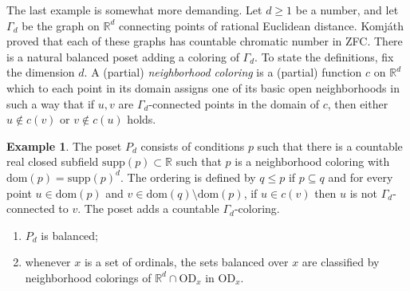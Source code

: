 \documentclass{article}
\newcommand{\supp}{\mathrm{supp}}
\newcommand{\dom}{\mathrm{dom}}
\newcommand{\vd}{\mathrm{OD}}
\theoremstyle{definition}
\newtheorem{example}[theorem]{Example}
\begin{document}
\noindent The last example is somewhat more demanding. Let $d\geq 1$ be a number, and let $\Gamma_d$ be the graph on $\mathbb{R}^d$ connecting points of rational Euclidean distance. Komj{\' a}th \cite{komjath:rn} proved that each of these graphs has countable chromatic number in ZFC. There is a natural balanced poset adding a coloring of $\Gamma_d$. To state the definitions, fix the dimension $d$. A (partial) \emph{neighborhood coloring} is a (partial) function $c$ on $\mathbb{R}^d$ which to each point in its domain assigns one of its basic open neighborhoods in such a way that if $u, v$ are $\Gamma_d$-connected points in the domain of $c$, then either $u\notin c(v)$ or $v\notin c(u)$ holds. 


\begin{example}
\label{algebraicexample}
The poset $P_d$ consists of conditions $p$ such that there is a countable real closed subfield $\supp(p)\subset\mathbb{R}$ such that $p$ is a neighborhood coloring with $\dom(p)=\supp(p)^d$. The ordering is defined by $q\leq p$ if $p\subseteq q$ and for every point $u\in\dom(p)$ and $v\in\dom(q)\setminus\dom(p)$, if $u\in c(v)$ then $u$ is not $\Gamma_d$-connected to $v$. The poset adds a countable $\Gamma_d$-coloring.

\begin{enumerate}
\item $P_d$ is balanced;
\item whenever $x$ is a set of ordinals, the sets balanced over $x$ are classified by neighborhood colorings of $\mathbb{R}^d\cap\vd_x$ in $\vd_x$.
\end{enumerate}
\end{example}
\end{document}
